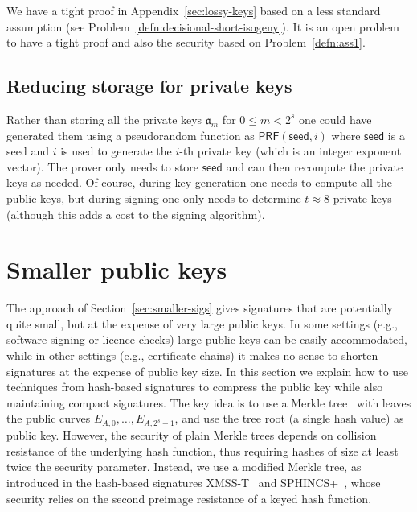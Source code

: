 \documentclass{llncs}
\newcommand{\seed}{\mathsf{seed}}
\renewcommand{\a}{\mathfrak{a}}
\newcommand{\PRF}{\mathsf{PRF}}
\begin{document}
We have a tight proof in Appendix~\ref{sec:lossy-keys} based on a less standard assumption (see Problem~\ref{defn:decisional-short-isogeny}). It is an open problem to have a tight proof and also the security based on Problem~\ref{defn:ass1}.





\subsection{Reducing storage for private keys}\label{sec:private-key-compress}

Rather than storing all the private keys $\a_m$ for $0 \le m < 2^s$ one could have generated them using a pseudorandom function as $\PRF( \seed, i )$ where $\seed$ is a seed and $i$ is used to generate the $i$-th private key (which is an integer exponent vector).
The prover only needs to store $\seed$ and can then recompute the private keys as needed.
Of course, during key generation one needs to compute all the public keys, but during signing one only needs to determine $t \approx 8$ private keys (although this adds a cost to the signing algorithm).




\section{Smaller public keys} \label{sec:smaller-keys}

The approach of Section~\ref{sec:smaller-sigs} gives signatures that are potentially quite small, but at the expense of very large public keys. In some settings (e.g., software signing or licence checks) large public keys can be easily accommodated, while in other settings (e.g., certificate chains) it makes no sense to shorten signatures at the expense of public key size.
In this section we explain how to use techniques from hash-based signatures to compress the public key while also maintaining compact signatures.
The key idea is to use a Merkle tree~\cite{10.1007/0-387-34805-0_21} with leaves the public curves $E_{A,0}, \dots, E_{A,2^s-1}$, and use the tree root (a single hash value) as public key.
However, the security of plain Merkle trees depends on collision resistance of the underlying hash function, thus requiring hashes of size at least twice the security parameter.
Instead, we use a modified Merkle tree, as introduced in the hash-based signatures XMSS-T~\cite{10.1007/978-3-662-49384-7_15} and SPHINCS+~\cite{sphincs+}, whose security relies on the second preimage resistance of a keyed hash function.
\end{document}

